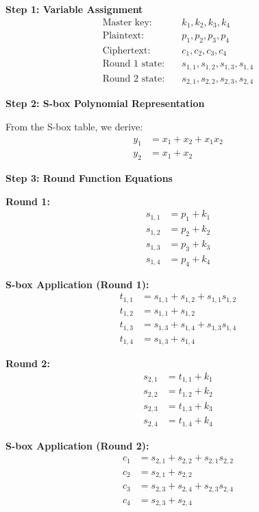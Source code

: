 \documentclass[12pt,a4paper]{article}
\begin{document}
\textbf{Step 1: Variable Assignment}
\begin{align}
\text{Master key:} \quad & k_1, k_2, k_3, k_4 \\
\text{Plaintext:} \quad & p_1, p_2, p_3, p_4 \\
\text{Ciphertext:} \quad & c_1, c_2, c_3, c_4 \\
\text{Round 1 state:} \quad & s_{1,1}, s_{1,2}, s_{1,3}, s_{1,4} \\
\text{Round 2 state:} \quad & s_{2,1}, s_{2,2}, s_{2,3}, s_{2,4}
\end{align}

\textbf{Step 2: S-box Polynomial Representation}

From the S-box table, we derive:
\begin{align}
y_1 &= x_1 + x_2 + x_1 x_2 \\
y_2 &= x_1 + x_2
\end{align}

\textbf{Step 3: Round Function Equations}

\textbf{Round 1:}
\begin{align}
s_{1,1} &= p_1 + k_1 \\
s_{1,2} &= p_2 + k_2 \\
s_{1,3} &= p_3 + k_3 \\
s_{1,4} &= p_4 + k_4
\end{align}

\textbf{S-box Application (Round 1):}
\begin{align}
t_{1,1} &= s_{1,1} + s_{1,2} + s_{1,1} s_{1,2} \\
t_{1,2} &= s_{1,1} + s_{1,2} \\
t_{1,3} &= s_{1,3} + s_{1,4} + s_{1,3} s_{1,4} \\
t_{1,4} &= s_{1,3} + s_{1,4}
\end{align}

\textbf{Round 2:}
\begin{align}
s_{2,1} &= t_{1,1} + k_1 \\
s_{2,2} &= t_{1,2} + k_2 \\
s_{2,3} &= t_{1,3} + k_3 \\
s_{2,4} &= t_{1,4} + k_4
\end{align}

\textbf{S-box Application (Round 2):}
\begin{align}
c_1 &= s_{2,1} + s_{2,2} + s_{2,1} s_{2,2} \\
c_2 &= s_{2,1} + s_{2,2} \\
c_3 &= s_{2,3} + s_{2,4} + s_{2,3} s_{2,4} \\
c_4 &= s_{2,3} + s_{2,4}
\end{align}
\end{document}
